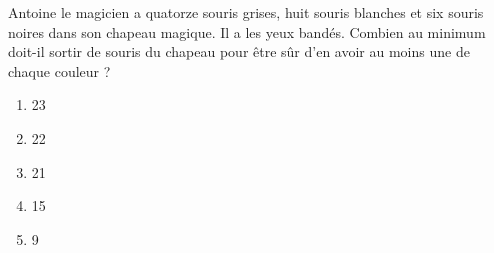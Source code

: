 Antoine le magicien a quatorze souris grises, huit souris blanches et six souris noires dans son chapeau magique. Il a les yeux bandés. Combien au minimum doit-il sortir de souris du chapeau pour être sûr d'en avoir au moins une de chaque couleur ?
\begin{multicols}{5}
  \begin{enumerate}[A/]
  \item 23
  \item 22
  \item 21
  \item 15
  \item 9
  \end{enumerate}
\end{multicols}